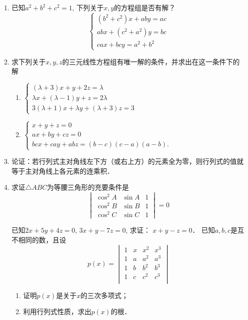 \begin{enumerate}
\item 已知$a^2+b^2+c^2=1$, 下列关于$x,y$的方程组是否有解？
\[\begin{cases}
    (b^2+c^2)x+aby=ac\\
    abx+ (c^2+a^2) y=bc\\
    cax+bcy=a^2+b^2
\end{cases}\]


\item 求下列关于$x,y,z$的三元线性方程组有唯一解的条件，并求出在这一条件下的解
\begin{enumerate}
    \item $\begin{cases}
        (\lambda+3) x+y+2z=\lambda\\
        \lambda x+ (\lambda-1) y+z=2\lambda\\
3 (\lambda+1)x +\lambda y+ (\lambda+3) z=3
    \end{cases}$
    \item $\begin{cases}
        x+y+z=0\\
        ax+by+cz=0\\
        bcx+cay+abz= (b-c) (c-a)(a-b).
    \end{cases}$
\end{enumerate}


\item 论证：若行列式主对角线左下方（或右上方）的元素全为零，则行列式的值就等于主对角线上各元素的连乘积．


\item 求证$\triangle ABC$为等腰三角形的充要条件是
\[\begin{vmatrix}
    \cos^2A& \sin A &1\\
    \cos^2B& \sin B &1\\
    \cos^2C& \sin C &1
\end{vmatrix}=0\]

\staritem 已知$2x+5y+4z=0$, $3x+y-7z=0$, 求证：
$x+y-z=0$．
\staritem 已知$a,b,c$是互不相同的数，且设
\[p (x) =\begin{vmatrix}
    1&x&x^2&x^3\\
    1&a&a^2&a^3\\
    1&b&b^2&b^3\\
    1&c&c^2&c^3\\
\end{vmatrix}\]
\begin{enumerate}
    \item 证明$p(x)$是关于$x$的三次多项式；
    \item 利用行列式性质，求出$p(x)$的根．
\end{enumerate}



\end{enumerate}
